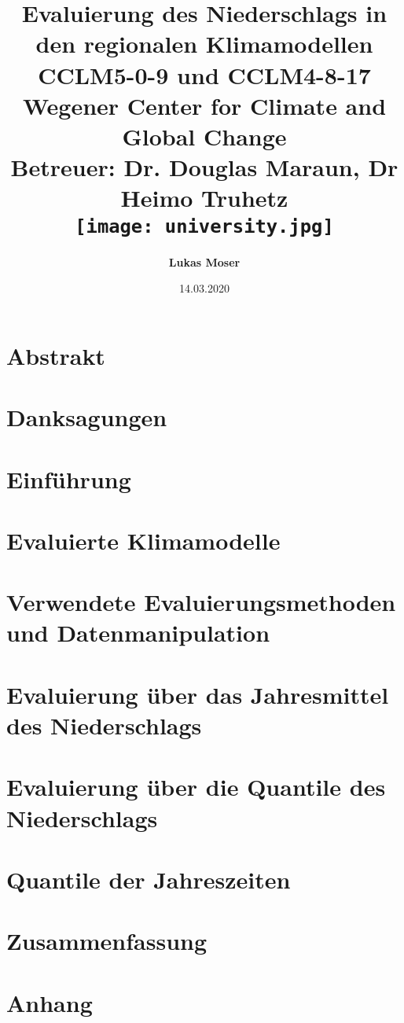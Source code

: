 \documentclass[12pt,twoside]{report}
\title{
	{\textbf{Evaluierung des Niederschlags in den regionalen Klimamodellen CCLM5-0-9 und CCLM4-8-17}}\\
	\vspace{20pt}
	{\Large Wegener Center for Climate and Global Change}\\
	{\large Betreuer: Dr. Douglas Maraun, Dr Heimo Truhetz}\\
	\vspace{20pt}
	{\texttt{[image: university.jpg]}}\\
}
\author{\Large{\textbf{Lukas Moser}}}
\date{14.03.2020}
\begin{document}
	\maketitle

	
	\chapter*{Abstrakt}
	
	
	\chapter*{Danksagungen}
	
	\tableofcontents
	
	\chapter{Einführung}
	\label{chap:intro}
	
	
	\chapter{Evaluierte Klimamodelle}
	\label{chap:modells}
	
	
	\chapter{Verwendete Evaluierungsmethoden und Datenmanipulation}
	\label{chap:methods}
	
	
	\chapter{Evaluierung über das Jahresmittel des Niederschlags}
	\label{chap:mean}
	
	
	\chapter{Evaluierung über die Quantile des Niederschlags}
	\label{chap:quantile}
	
	
	\chapter{Quantile der Jahreszeiten}
	\label{chap:quantile_seasons}
	
	
	\chapter{Zusammenfassung}
	\label{chap:conclusion}
	
	
	\appendix
		\bgroup
		\titleformat{\chapter}{}{}{0pt}{\normalfont\Large\bfseries}
		\titlespacing*{\chapter}{0pt}{0pt}{20pt}
		\chapter{Anhang}
		
		
	\egroup
	\printbibliography[title=Referenzen]
\end{document}
